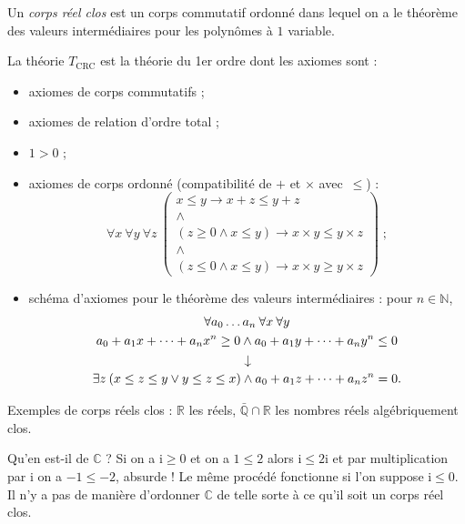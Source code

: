 \documentclass[./main]{subfiles}
\begin{document}
  \begin{defn}
    Un \textit{corps réel clos} est un corps commutatif ordonné dans lequel on a le théorème des valeurs intermédiaires pour les polynômes à $1$ variable.

    La théorie $T_\mathrm{CRC}$ est la théorie du 1er ordre dont les axiomes sont :
    \begin{itemize}
      \item axiomes de corps commutatifs ;
      \item axiomes de relation d'ordre total ;
      \item $1 > 0$ ;
      \item axiomes de corps ordonné (compatibilité de $+$ et $\times$ avec~$\le$) :
        \[
        \forall x \: \forall y \: \forall z \: 
        \begin{pmatrix}
          x \le  y \to  x + z \le  y + z\\
          \land\\
          (z \ge 0 \land x \le y) \to x \times y \le  y \times z\\
          \land \\
          (z \le 0 \land x \le y) \to x \times y \ge y \times z
        \end{pmatrix}  \;
        ;\]
      \item schéma d'axiomes pour le théorème des valeurs intermédiaires : pour $n \in \mathds{N}$, 
        \begin{gather*}
        \forall a_0 \ldots a_n \: \forall x \: \forall y\\
        a_0 + a_1 x + \cdots + a_n x^n \ge 0 \land a_0 + a_1 y + \cdots + a_n y^n \le 0\\
        \vertical\to\\
        \exists z \: (x \le z \le y \lor y \le z \le x) \land a_0 + a_1 z + \cdots + a_n z^n = 0
        .\end{gather*}
    \end{itemize}
  \end{defn}

  \begin{exm}
    Exemples de corps réels clos : $\mathds{R}$ les réels, $\bar{\mathds{Q}} \cap \mathds{R}$ les nombres réels algébriquement clos.

    Qu'en est-il de $\mathds{C}$ ?
    Si on a $\mathrm{i} \ge 0$ et on a $1 \le 2$ alors $\mathrm{i} \le 2 \mathrm{i}$ et par multiplication par $\mathrm{i}$ on a $-1 \le -2$, absurde !
    Le même procédé fonctionne si l'on suppose $\mathrm{i}\le 0$.
    Il n'y a pas de manière d'ordonner $\mathds{C}$ de telle sorte à ce qu'il soit un corps réel clos.
  \end{exm}
\end{document}
